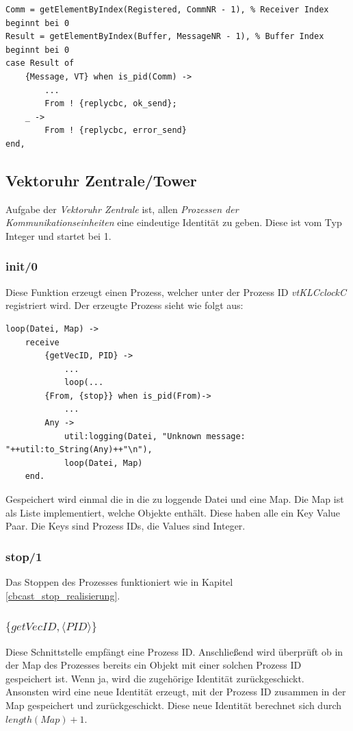 \begin{lstlisting}[caption={Codeausschnitt multicastM},captionpos=b, label={towercbc_m_realisierung_code}]
Comm = getElementByIndex(Registered, CommNR - 1), % Receiver Index beginnt bei 0
Result = getElementByIndex(Buffer, MessageNR - 1), % Buffer Index beginnt bei 0
case Result of
    {Message, VT} when is_pid(Comm) -> 
        ...
        From ! {replycbc, ok_send};
    _ -> 
        From ! {replycbc, error_send}
end,
\end{lstlisting}

\subsection{Vektoruhr Zentrale/Tower}

Aufgabe der \textit{Vektoruhr Zentrale} ist, allen \textit{Prozessen der Kommunikationseinheiten} eine eindeutige Identität zu geben. Diese ist vom Typ Integer und startet bei 1.

\subsubsection{init/0}

Diese Funktion erzeugt einen Prozess, welcher unter der Prozess ID \textit{vtKLCclockC} registriert wird. Der erzeugte Prozess sieht wie folgt aus:

\begin{lstlisting}
loop(Datei, Map) ->
    receive
        {getVecID, PID} ->
            ...
            loop(...
        {From, {stop}} when is_pid(From)->
            ...
        Any -> 
            util:logging(Datei, "Unknown message: "++util:to_String(Any)++"\n"),
            loop(Datei, Map)
    end.
\end{lstlisting}

Gespeichert wird einmal die in die zu loggende Datei und eine Map. Die Map ist als Liste implementiert, welche Objekte enthält. Diese haben alle ein Key Value Paar. Die Keys sind Prozess IDs, die Values sind Integer.

\subsubsection{stop/1}

Das Stoppen des Prozesses funktioniert wie in Kapitel \ref{cbcast_stop_realisierung}.

\subsubsection{$\{getVecID,\langle PID\rangle\}$}

Diese Schnittstelle empfängt eine Prozess ID. Anschließend wird überprüft ob in der Map des Prozesses bereits ein Objekt mit einer solchen Prozess ID gespeichert ist. Wenn ja, wird die zugehörige Identität zurückgeschickt. Ansonsten wird eine neue Identität erzeugt, mit der Prozess ID zusammen in der Map gespeichert und zurückgeschickt. Diese neue Identität berechnet sich durch $length(Map) + 1$.